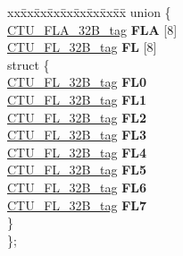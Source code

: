 \begin{DoxyCompactItemize}
\begin{tabbing}
\end{tabbing}\item 
\mbox{\label{structCTU__struct__tag_a015eae5ad77d23eb9ba964d67f66fa8a}} 
\begin{tabbing}
xx\=xx\=xx\=xx\=xx\=xx\=xx\=xx\=xx\=\kill
union \{\\
\>\mbox{\hyperlink{unionCTU__FLA__32B__tag}{CTU\_FLA\_32B\_tag}} {\bfseries FLA} \mbox{[}8\mbox{]}\\
\>\mbox{\hyperlink{unionCTU__FL__32B__tag}{CTU\_FL\_32B\_tag}} {\bfseries FL} \mbox{[}8\mbox{]}\\
\mbox{\label{unionCTU__struct__tag_1_1_0D1900_ac8180b2915f7d19a51434fd5788e533d}} 
\>struct \{\\
\>\>\mbox{\hyperlink{unionCTU__FL__32B__tag}{CTU\_FL\_32B\_tag}} {\bfseries FL0}\\
\>\>\mbox{\hyperlink{unionCTU__FL__32B__tag}{CTU\_FL\_32B\_tag}} {\bfseries FL1}\\
\>\>\mbox{\hyperlink{unionCTU__FL__32B__tag}{CTU\_FL\_32B\_tag}} {\bfseries FL2}\\
\>\>\mbox{\hyperlink{unionCTU__FL__32B__tag}{CTU\_FL\_32B\_tag}} {\bfseries FL3}\\
\>\>\mbox{\hyperlink{unionCTU__FL__32B__tag}{CTU\_FL\_32B\_tag}} {\bfseries FL4}\\
\>\>\mbox{\hyperlink{unionCTU__FL__32B__tag}{CTU\_FL\_32B\_tag}} {\bfseries FL5}\\
\>\>\mbox{\hyperlink{unionCTU__FL__32B__tag}{CTU\_FL\_32B\_tag}} {\bfseries FL6}\\
\>\>\mbox{\hyperlink{unionCTU__FL__32B__tag}{CTU\_FL\_32B\_tag}} {\bfseries FL7}\\
\>\} \\
\}; \\


\end{tabbing}
\end{DoxyCompactItemize}
